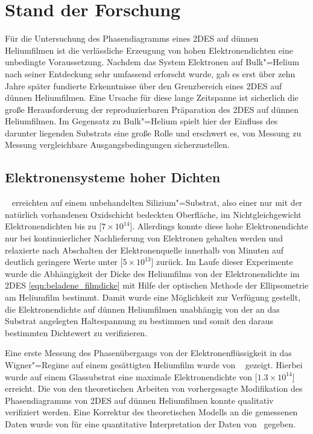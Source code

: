 \chapter{Stand der Forschung}
Für die Untersuchung des Phasendiagramms eines 2DES auf dünnen Heliumfilmen ist die  verlässliche Erzeugung von hohen Elektronendichten eine unbedingte Voraussetzung. Nachdem das System Elektronen auf Bulk"=Helium nach seiner Entdeckung sehr umfassend  erforscht wurde, gab es erst über zehn Jahre später fundierte Erkenntnisse über den Grenzbereich eines 2DES auf dünnen Heliumfilmen. Eine Ursache für diese lange Zeitspanne ist sicherlich die große Herausforderung der reproduzierbaren Präparation des 2DES auf dünnen Heliumfilmen. Im Gegensatz zu Bulk"=Helium spielt hier der Einfluss des darunter liegenden Substrats eine große Rolle und erschwert es, von Messung zu Messung vergleichbare Ausgangsbedingungen sicherzustellen. 
  
\section{Elektronensysteme hoher Dichten}
 \ea\ \cite{Etz84} erreichten auf einem unbehandelten Silizium"=Substrat, also einer nur mit der natürlich vorhandenen Oxidschicht bedeckten Oberfläche, im Nichtgleichgewicht Elektronendichten bis zu \unit[$7\times10^{14}$]{\Em}. Allerdings konnte diese hohe Elektronendichte nur bei kontinuierlicher Nachlieferung von Elektronen gehalten werden und relaxierte nach Abschalten der Elektronenquelle innerhalb von Minuten auf deutlich geringere Werte unter \unit[$5\times10^{13}$]{\Em} zurück. Im Laufe dieser Experimente wurde die Abhängigkeit der Dicke des Heliumfilms von der Elektronendichte im 2DES \eqref{eqn:beladene_filmdicke} mit Hilfe der optischen Methode der Ellipsometrie am Heliumfilm bestimmt. Damit wurde eine Möglichkeit zur Verfügung gestellt, die Elektronendichte auf dünnen Heliumfilmen unabhängig von der an das Substrat angelegten Haltespannung zu bestimmen und somit den daraus bestimmten Dichtewert zu verifizieren.

Eine erste Messung des Phasenübergangs von der Elektronenflüssigkeit in das Wigner"=Regime auf einem gesättigten Heliumfilm wurde von  \ea\ \cite{Jia88} gezeigt. Hierbei wurde auf einem Glassubstrat eine maximale Elektronendichte von \unit[$1.3\times10^{14}$]{\Em} erreicht. Die von den theoretischen Arbeiten von  \ea{} \cite{Pee83, Pee84} vorhergesagte Modifikation des Phasendiagramms von 2DES auf dünnen Heliumfilmen konnte qualitativ verifiziert werden. Eine Korrektur des theoretischen Modells an die gemessenen Daten wurde von  \cite{Sai89} für eine quantitative Interpretation der Daten von  \ea\ gegeben.

